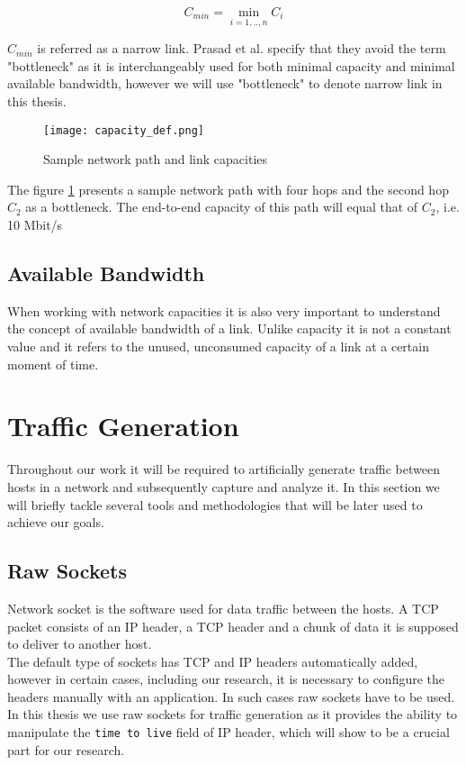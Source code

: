 \[C_{min}= \min_{i=1,..,n} C_i\] 

$C_{min}$ is referred as a narrow link. Prasad et al.\cite{Prasad2003} specify that they avoid the term "bottleneck" as it is interchangeably used for both minimal capacity and minimal available bandwidth, however we will use "bottleneck" to denote narrow link in this thesis.



\begin{figure}[H]
 \centering
 \texttt{[image: capacity\_def.png]}
 \caption{Sample network path and link capacities}
 \label{capacity_def}
\end{figure}

The figure \ref{capacity_def} presents a sample network path with four hops and the second hop $C_2$ as a bottleneck. The end-to-end capacity of this path will equal that of $C_2$, i.e. 10 Mbit/s


\subsection*{Available Bandwidth}
When working with network capacities it is also very important to understand the concept of available bandwidth of a link. Unlike capacity it is not a constant value and it refers to the unused, unconsumed capacity of a link at a certain moment of time\cite{Prasad2003}. 

\section{Traffic Generation}
Throughout our work it will be required to artificially generate traffic between hosts in a network and subsequently capture and analyze it. In this section we will briefly tackle several tools and methodologies that will be later used to achieve our goals.

\subsection*{Raw Sockets}
Network socket is the software used for data traffic between the hosts. 
A TCP packet consists of an IP header, a TCP header and a chunk of data it is supposed to deliver to another host\cite{tcp_raw_sockets}.\\
The default type of sockets has TCP and IP headers automatically added, however in certain cases, including our research, it is necessary to configure the headers manually with an application. In such cases raw sockets have to be used.\\
In this thesis we use raw sockets for traffic generation as it provides the ability to manipulate the \texttt{time to live} field of IP header, which will show to be a crucial part for our research.


